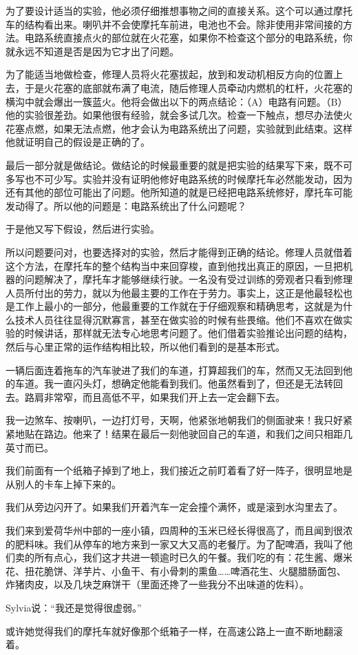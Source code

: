 \documentclass[UTF8]{article}
\begin{document}
\par 为了要设计适当的实验，他必须仔细推想事物之间的直接关系。这个可以通过摩托车的结构看出来。喇叭并不会使摩托车前进，电池也不会。除非使用非常间接的方法。电路系统直接点火的部位就在火花塞，如果你不检查这个部分的电路系统，你就永远不知道是否是因为它才出了问题。
\par 为了能适当地做检查，修理人员将火花塞拔起，放到和发动机相反方向的位置上去，于是火花塞的底部就布满了电流，随后修理人员牵动内燃机的杠杆，火花塞的横沟中就会爆出一簇蓝火。他将会做出以下的两点结论：（A）电路有问题。（B）他的实验很差劲。如果他很有经验，就会多试几次。检查一下触点，想尽办法使火花塞点燃，如果无法点燃，他才会认为电路系统出了问题，实验就到此结束。这样他就证明自己的假设是正确的了。
\par 最后一部分就是做结论。做结论的时候最重要的就是把实验的结果写下来，既不可多写也不可少写。实验并没有证明他修好电路系统的时候摩托车必然能发动，因为还有其他的部位可能出了问题。他所知道的就是已经把电路系统修好，摩托车可能发动得了。所以他的问题是：电路系统出了什么问题呢？
\par 于是他又写下假设，然后进行实验。
\par 所以问题要问对，也要选择对的实验，然后才能得到正确的结论。修理人员就借着这个方法，在摩托车的整个结构当中来回穿梭，直到他找出真正的原因，一旦把机器的问题解决了，摩托车才能够继续行驶。一名没有受过训练的旁观者只看到修理人员所付出的劳力，就以为他最主要的工作在于劳力。事实上，这正是他最轻松也是工作上最小的一部分，他最重要的工作就在于仔细观察和精确思考，这就是为什么技术人员往往显得沉默寡言，甚至在做实验的时候有些畏缩。他们不喜欢在做实验的时候讲话，那样就无法专心地思考问题了。他们借着实验推论出问题的结构，然后与心里正常的运作结构相比较，所以他们看到的是基本形式。
\par 一辆后面连着拖车的汽车驶进了我们的车道，打算超我们的车，然而又无法回到他的车道。我一直闪头灯，想确定他能看到我们。他虽然看到了，但还是无法转回去。路肩非常窄，而且高低不平，如果我们开上去一定会翻下去。
\par 我一边煞车、按喇叭，一边打灯号，天啊，他紧张地朝我们的侧面驶来！我只好紧紧地贴在路边。他来了！结果在最后一刻他驶回自己的车道，和我们之间只相距几英寸而已。
\par 我们前面有一个纸箱子掉到了地上，我们接近之前盯着看了好一阵子，很明显地是从别人的卡车上掉下来的。
\par 我们从旁边闪开了。如果我们开着汽车一定会撞个满怀，或是滚到水沟里去了。
\par 我们来到爱荷华州中部的一座小镇，四周种的玉米已经长得很高了，而且闻到很浓的肥料味。我们从停车的地方来到一家又大又高的老餐厅。为了配啤酒，我叫了他们卖的所有点心，我们这才共进一顿逾时已久的午餐。我们吃的有：花生酱、爆米花、扭花脆饼、洋芋片、小鱼干、有小骨刺的熏鱼……啤酒花生、火腿腊肠面包、炸猪肉皮，以及几块芝麻饼干（里面还搀了一些我分不出味道的佐料）。
\par Sylvia说：“我还是觉得很虚弱。”
\par 或许她觉得我们的摩托车就好像那个纸箱子一样，在高速公路上一直不断地翻滚着。
\end{document}
